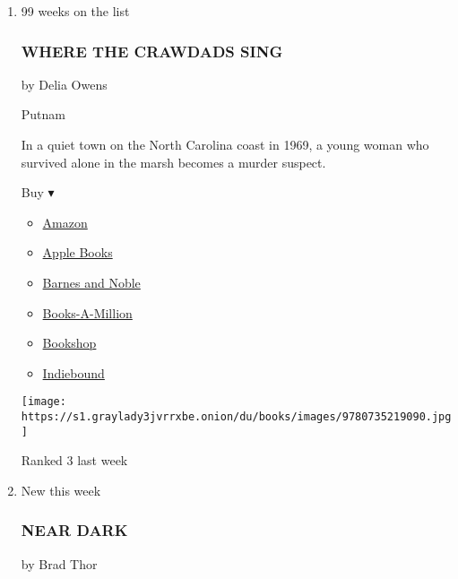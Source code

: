 \begin{enumerate}
\def\labelenumi{\arabic{enumi}.}
\item
  99 weeks on the list

  \hypertarget{where-the-crawdads-sing}{%
  \subsubsection{WHERE THE CRAWDADS
  SING}\label{where-the-crawdads-sing}}

  by Delia Owens

  Putnam

  In a quiet town on the North Carolina coast in 1969, a young woman who
  survived alone in the marsh becomes a murder suspect.

  Buy ▾

  \begin{itemize}
  \tightlist
  \item
    \href{https://www.amazon.com/Where-Crawdads-Sing-Delia-Owens/dp/0735219095?tag=NYTBS-20}{Amazon}
  \item
    \href{https://du-gae-books-dot-nyt-du-prd.appspot.com/buy?title=WHERE+THE+CRAWDADS+SING\&author=Delia+Owens}{Apple
    Books}
  \item
    \href{https://www.anrdoezrs.net/click-7990613-11819508?url=https\%3A\%2F\%2Fwww.barnesandnoble.com\%2Fw\%2F\%3Fean\%3D9780735219090}{Barnes
    and Noble}
  \item
    \href{https://www.anrdoezrs.net/click-7990613-35140?url=https\%3A\%2F\%2Fwww.booksamillion.com\%2Fp\%2FWHERE\%2BTHE\%2BCRAWDADS\%2BSING\%2FDelia\%2BOwens\%2F9780735219090}{Books-A-Million}
  \item
    \href{https://bookshop.org/a/3546/9780735219090}{Bookshop}
  \item
    \href{https://www.indiebound.org/book/9780735219090?aff=NYT}{Indiebound}
  \end{itemize}

  \texttt{[image: https://s1.graylady3jvrrxbe.onion/du/books/images/9780735219090.jpg]}

  Ranked 3 last week
\item
  New this week

  \hypertarget{near-dark}{%
  \subsubsection{NEAR DARK}\label{near-dark}}

  by Brad Thor


\end{enumerate}

